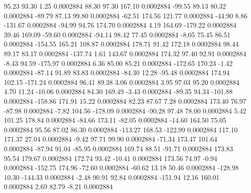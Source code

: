       95.23       93.30        1.25     0.0002884
       88.30       97.30      167.10     0.0002884
      -99.55       89.13       80.32     0.0002884
      -89.79       87.13       99.80     0.0002884
      -62.51      174.56      121.77     0.0002884
      -44.90        8.86     -131.67     0.0002884
      -94.99       94.76      174.70     0.0002884
        4.19      164.69     -179.22     0.0002884
       39.46      169.09      -59.60     0.0002884
      -94.14       98.42       77.45     0.0002884
       -8.05       75.45       86.51     0.0002884
     -154.55      165.21      108.87     0.0002884
      178.71       91.42      172.18     0.0002884
       98.44       89.17       83.17     0.0002884
     -137.74        1.61      143.67     0.0002884
      174.32       97.40       92.91     0.0002884
       -8.43       94.59     -175.97     0.0002884
        6.36       85.00       85.21     0.0002884
     -172.65      170.23       -1.42     0.0002884
      -87.14       91.89       83.83     0.0002884
      -84.30       12.28      -95.48     0.0002884
      174.94      102.15     -171.24     0.0002884
       96.41       89.38        3.06     0.0002884
        3.95       97.03       95.20     0.0002884
        4.70       11.24      -10.06     0.0002884
       84.30      169.49       -3.43     0.0002884
      -89.35       94.34     -101.88     0.0002884
     -158.86      171.91       15.22     0.0002884
       82.23       87.67        7.28     0.0002884
      173.40       76.97      -87.98     0.0002884
       -7.82      104.56     -178.09     0.0002884
      -90.28       97.48       78.00     0.0002884
        5.42      101.25      178.84     0.0002884
      -84.66      173.11      -82.05     0.0002884
      -14.60      164.50       75.05     0.0002884
       95.56       87.02       86.30     0.0002884
     -113.27      168.53     -122.99     0.0002884
      117.10      171.37       27.04     0.0002884
       -9.42       97.71       99.90     0.0002884
      -71.34      173.47      101.64     0.0002884
      -87.94       91.04      -85.95     0.0002884
      169.74       88.51      -91.71     0.0002884
      173.83       95.54      179.67     0.0002884
      172.74       93.42      -10.41     0.0002884
      173.56       74.97       -0.94     0.0002884
     -152.75      174.96      -72.60     0.0002884
      -60.62       13.18       50.46     0.0002884
     -128.98       10.30     -144.33     0.0002884
       -2.48       90.91       92.84     0.0002884
     -151.94       12.16      160.01     0.0002884
        2.69       82.79       -8.21     0.0002884
